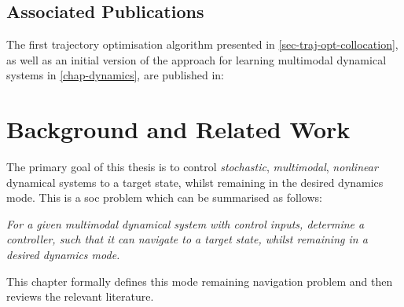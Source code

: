 \documentclass{mimosis-class/mimosis}
\numberwithin{equation}{chapter}
\begin{document}
\section{Associated Publications}
\label{sec:orgac47f11}
The first trajectory optimisation algorithm presented in \cref{sec-traj-opt-collocation}, as well as an initial
version of the approach for learning multimodal dynamical systems in \cref{chap-dynamics}, are published in:

{\color{BrickRed}}

\chapter{Background and Related Work}
\label{sec:org0ae7697}
\newcommand{\gpDomain}{\ensuremath{\mathcal{X}}}
\newcommand{\dynamicsModel}{\ensuremath{p_{\theta}}}
\newcommand{\constraintFunc}{\ensuremath{c}}
\newcommand{\safeSet}{\ensuremath{\mathcal{X}_{\text{feasible}}}}
The primary goal of this thesis is to control \emph{stochastic}, \emph{multimodal}, \emph{nonlinear} dynamical systems
to a target state, whilst remaining in the desired dynamics mode.
This is a \acrfull{soc} problem which can be summarised as follows:
\begin{displayquote}
\textit{For a given multimodal dynamical system with control inputs, determine a controller, such that
it can navigate to a target state, whilst remaining in a desired dynamics mode.}
\end{displayquote}
This chapter formally defines this mode remaining navigation problem and then reviews the relevant literature.
\end{document}
